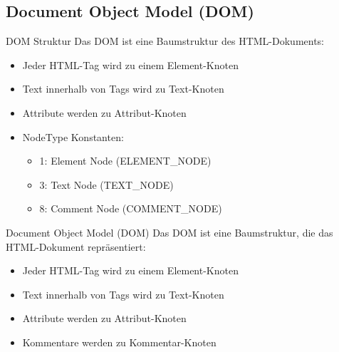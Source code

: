 \subsection{Document Object Model (DOM)}

\begin{concept}{DOM Struktur}
    Das DOM ist eine Baumstruktur des HTML-Dokuments:
    \begin{itemize}
        \item Jeder HTML-Tag wird zu einem Element-Knoten
        \item Text innerhalb von Tags wird zu Text-Knoten
        \item Attribute werden zu Attribut-Knoten
        \item NodeType Konstanten:
            \begin{itemize}
                \item 1: Element Node (ELEMENT\_NODE)
                \item 3: Text Node (TEXT\_NODE)
                \item 8: Comment Node (COMMENT\_NODE)
            \end{itemize}
    \end{itemize}
\end{concept}

\begin{concept}{Document Object Model (DOM)}
    Das DOM ist eine Baumstruktur, die das HTML-Dokument repräsentiert:
    \begin{itemize}
        \item Jeder HTML-Tag wird zu einem Element-Knoten
        \item Text innerhalb von Tags wird zu Text-Knoten
        \item Attribute werden zu Attribut-Knoten
        \item Kommentare werden zu Kommentar-Knoten
    \end{itemize}
\end{concept}

